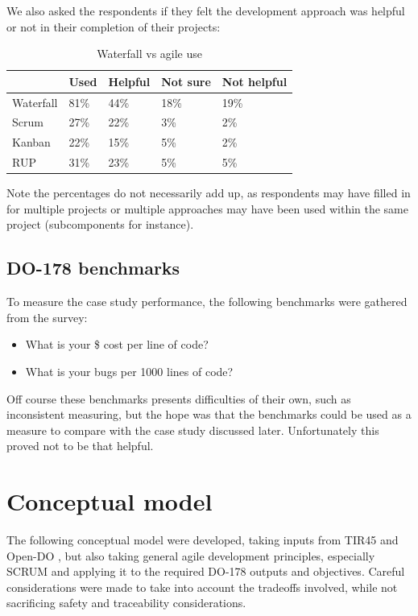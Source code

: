 \documentclass{sig-alternate-05-2015}
\begin{document}
We also asked the respondents if they felt the development approach was helpful or not in their completion of their projects:

\begin{table}[]
	\centering
	\caption{Waterfall vs agile use}
	\label{Waterfall vs agile use}
	\begin{tabular}{l|llll}
		& Used & Helpful & Not sure & Not helpful \\ \hline
		Waterfall & 81\% & 44\%    & 18\%     & 19\%        \\
		Scrum     & 27\% & 22\%    & 3\%      & 2\%         \\
		Kanban    & 22\% & 15\%    & 5\%      & 2\%        	\\
		RUP       & 31\% & 23\%    & 5\%      & 5\% 
	\end{tabular}
\end{table}

Note the percentages do not necessarily add up, as respondents may have filled in for multiple projects or multiple approaches may have been used within the same project (subcomponents for instance).    

\subsection{DO-178 benchmarks}
To measure the case study performance, the following benchmarks were gathered from the survey:

\begin{itemize}
	\item What is your \$ cost per line of code?
	\item What is your bugs per 1000 lines of code?
\end{itemize}

Off course these benchmarks presents difficulties of their own, such as inconsistent measuring, but the hope was that the benchmarks could be used as a measure to compare with the case study discussed later. Unfortunately this proved not to be that helpful.

\section{Conceptual model}

The following conceptual model were developed, taking inputs from TIR45 \cite{AAMI_TIR45_2012} and Open-DO \cite{OPEN-DO_2010}, but also taking general agile development principles, especially SCRUM and applying it to the required DO-178 outputs and objectives. Careful considerations were made to take into account the tradeoffs involved, while not sacrificing safety and traceability considerations.
\end{document}
